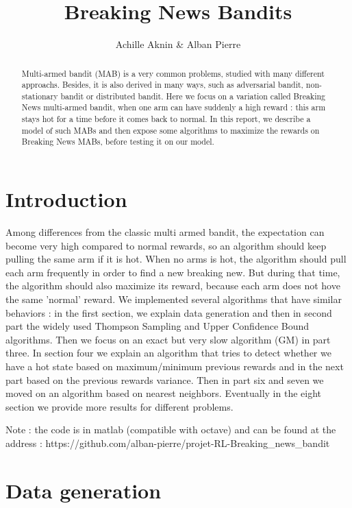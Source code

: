 \documentclass{article} %
\title{Breaking News Bandits}
\author{Achille Aknin \& Alban Pierre}
\begin{document}
\maketitle

\begin{abstract}
Multi-armed bandit (MAB) is a very common problems, studied with many different approachs.
Besides, it is also derived in many ways, such as adversarial bandit, non-stationary bandit or distributed bandit.
Here we focus on a variation called
Breaking News multi-armed bandit, when one arm can have suddenly a high reward : this arm stays hot for a time before it comes back to normal.
In this report, we describe a model of such MABs and then expose some algorithms to maximize the rewards
on Breaking News MABs, before testing it on our model.
\end{abstract}

\section{Introduction}

Among differences from the classic multi armed bandit, the expectation can become very high compared to normal rewards, so an algorithm should keep pulling the same arm if it is hot. When no arms is hot, the algorithm should pull each arm frequently in order to find a new breaking new. But during that time, the algorithm should also maximize its reward, because each arm does not hove the same 'normal' reward. We implemented several algorithms that have similar behaviors : in the first section, we explain data generation and then in second part the widely used Thompson Sampling and Upper Confidence Bound algorithms. Then we focus on an exact but very slow algorithm (GM) in part three. In section four we explain an algorithm that tries to detect whether we have a hot state based on maximum/minimum previous rewards and in the next part based on the previous rewards variance. Then in part six and seven we moved on an algorithm based on nearest neighbors. Eventually in the eight section we provide more results for different problems.
\newline

Note : the code is in matlab (compatible with octave) and can be found at the address : https://github.com/alban-pierre/projet-RL-Breaking\_news\_bandit


\section{Data generation}
\end{document}
